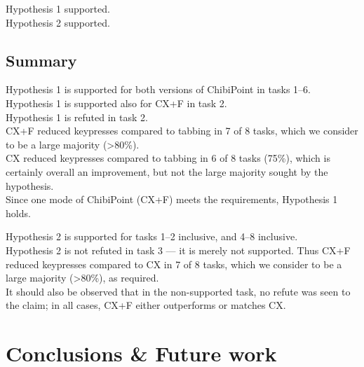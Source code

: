 \documentclass[a4paper, 12pt]{report}
\begin{document}
Hypothesis 1 supported.\\
Hypothesis 2 supported.

\section{Summary}
Hypothesis 1 is supported for both versions of ChibiPoint in tasks 1--6.\\
Hypothesis 1 is supported also for CX+F in task 2.\\
Hypothesis 1 is refuted in task 2.\\
CX+F reduced keypresses compared to tabbing in 7 of 8 tasks, which we consider to be a large majority (>80\%).\\
CX reduced keypresses compared to tabbing in 6 of 8 tasks (75\%), which is certainly overall an improvement, but not the large majority sought by the hypothesis.\\
Since one mode of ChibiPoint (CX+F) meets the requirements, Hypothesis 1 holds.

Hypothesis 2 is supported for tasks 1--2 inclusive, and 4--8 inclusive.\\
Hypothesis 2 is not refuted in task 3 --- it is merely not supported.
Thus CX+F reduced keypresses compared to CX in 7 of 8 tasks, which we consider to be a large majority (>80\%), as required.\\
It should also be observed that in the non-supported task, no refute was seen to the claim; in all cases, CX+F either outperforms or matches CX.

\chapter{Conclusions \& Future work}
\end{document}
